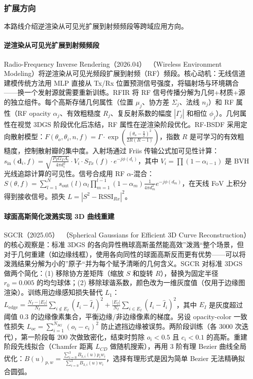 \subsubsection{扩展方向}

本路线介绍逆渲染从可见光扩展到射频频段等跨域应用方向。

\paragraph{逆渲染从可见光扩展到射频频段}

Radio-Frequency Inverse Rendering（2026.04）~\cite{2604_07086}（Wireless Environment Modeling）将逆渲染从可见光频段扩展到射频（RF）频段。核心动机：无线信道建模传统方法用 MLP 直接从 Tx/Rx 位置预测信号强度，将辐射场与环境耦合——换一个发射源就需要重新训练。RFIR 将 RF 信号传播分解为几何+材质+源的独立组件。每个高斯存储几何属性（位置 $\mu_j$、协方差 $\Sigma_j$、法线 $n_j$）和 RF 属性（RF opacity $\alpha_j$、有效粗糙度 $R_j$、复反射系数的幅度 $|\Gamma_j|$ 和相位 $\phi_j$）。几何属性在视觉 3DGS 阶段优化后冻结，RF 属性在逆渲染阶段优化。RF-BSDF 采用定向散射模型：$F(\theta_o, \theta_i, n, f) = \Gamma \cdot \exp\left(\frac{(\theta_o - \frac{\pi}{2})^2}{2R(R-1)}\right)$，指数 $R$ 是可学习的有效粗糙度，控制散射瓣的集中度。入射场通过 Friis 传输公式加可见性计算：$s_{\text{in}}(\mathbf{d}_i, f) = \sqrt{\frac{P_T G_T A_i}{4\pi d_i^2}} \cdot V_i \cdot S_{Tx}(f) \cdot e^{-j\phi(d_i)}$，其中 $V_i = \prod(1-\alpha_{i-1})$ 是 BVH 光线追踪计算的可见性。信号合成用 RF $\alpha$-混合：$S(\theta, f) = \sum_{l=1}^{N} s_{\text{out}}(l) \alpha_l \prod_{m=1}^{l-1}(1-\alpha_m) \frac{1}{4\pi d_m^2} e^{-j\phi(d_m)}$，在天线 FoV 上积分得到接收信号。损失 $L = |S^2 - \text{RSSI}_{Rx}|^2$。

\paragraph{球面高斯简化泼溅实现 3D 曲线重建}

SGCR（2025.05）~\cite{2505_04668}（Spherical Gaussians for Efficient 3D Curve Reconstruction）的核心观察是：标准 3DGS 的各向异性椭球高斯虽然能高效”泼溅“整个场景，但对于几何重建（如边缘线框），使用各向同性的球面高斯反而更有优势——可以将泼溅结果分解为小的”原子“并为每个赋予清晰的几何含义。SGCR 对标准 3DGS 做两个简化：(1) 移除协方差矩阵（缩放 $S$ 和旋转 $R$），替换为固定半径 $r_0=0.005$ 的均匀球体；(2) 移除球谐系数，颜色改为一维灰度值（仅用于边缘图渲染）。训练用边缘感知损失替代 $L_1$：$L_{\text{edge}} = \frac{N_I - |E_I|}{N_I}\sum_{i \notin E_I}(I_i - \hat{I}_i)^2 + \frac{|E_I|}{N_I}\sum_{i \in E_I}(I_i - \hat{I}_i)^2$，其中 $E_I$ 是灰度超过阈值 0.3 的边缘像素集合，平衡边缘/非边缘像素的梯度。另设 opacity-color 一致性损失 $L_{oc} = \sum_{i=1}^{N_{SG}}(o_i - c_i)^2$ 防止遮挡边缘被误剪。两阶段训练（各 3000 次迭代），第一阶段每 200 次做致密化，结束时剪除 $o_i < 0.5$ 且 $c_i < 0.1$ 的高斯。重建阶段先线拟合（Chamfer 距离 $L_{CD}$ 做随机搜索），再用 3 阶有理 Bezier 曲线全局优化：$B(u)_{p,w} = \frac{\sum_{i=0}^{3} B_{3,i}(u) p_i w_i}{\sum_{i=0}^{3} B_{3,i}(u) w_i}$，选择有理形式是因为简单 Bezier 无法精确拟合圆弧。

